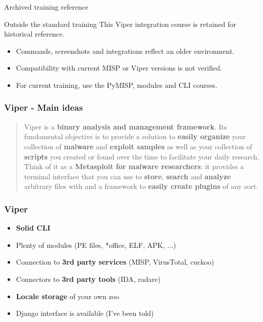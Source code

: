 

\begin{frame}[t,plain]
\titlepage
\end{frame}

\begin{frame}{Archived training reference}
    \begin{alertblock}{Outside the standard training}
        This Viper integration course is retained for historical reference.
    \end{alertblock}
    \begin{itemize}
        \item Commands, screenshots and integrations reflect an older environment.
        \item Compatibility with current MISP or Viper versions is not verified.
        \item For current training, use the PyMISP, modules and CLI courses.
    \end{itemize}
\end{frame}


\begin{frame}[fragile]
    \frametitle{Viper - Main ideas}
    \begin{quote}
        Viper is a {\bf binary analysis and management framework}. Its
        fundamental objective is to provide a solution to {\bf easily organize}
        your collection of {\bf malware} and {\bf exploit samples} as well as your
        collection of {\bf scripts} you created or found over the time to
        facilitate your daily research. Think of it as a {\bf Metasploit for malware
        researchers}: it provides a terminal interface that you can use to {\bf store},
        {\bf search} and {\bf analyze} arbitrary files with and a framework to
        {\bf easily create plugins} of any sort.
    \end{quote}
\end{frame}


\begin{frame}[fragile]
    \frametitle{Viper}
    \begin{itemize}
        \item {\bf Solid CLI}
        \item Plenty of modules (PE files, *office, ELF, APK, ...)
        \item Connection to {\bf 3rd party services} (MISP, VirusTotal, cuckoo)
        \item Connectors to {\bf 3rd party tools} (IDA, radare)
        \item {\bf Locale storage} of your own zoo
        \item Django interface is available (I've been told)
    \end{itemize}
\end{frame}

